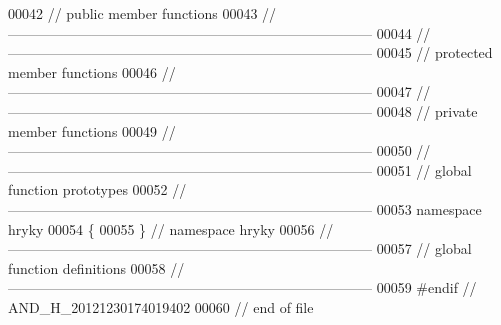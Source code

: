 \begin{DoxyCode}
00042 \textcolor{comment}{// public member functions}
00043 \textcolor{comment}{//
      ------------------------------------------------------------------------------}
00044 \textcolor{comment}{//
      ------------------------------------------------------------------------------}
00045 \textcolor{comment}{// protected member functions}
00046 \textcolor{comment}{//
      ------------------------------------------------------------------------------}
00047 \textcolor{comment}{//
      ------------------------------------------------------------------------------}
00048 \textcolor{comment}{// private member functions}
00049 \textcolor{comment}{//
      ------------------------------------------------------------------------------}
00050 \textcolor{comment}{//
      ------------------------------------------------------------------------------}
00051 \textcolor{comment}{// global function prototypes}
00052 \textcolor{comment}{//
      ------------------------------------------------------------------------------}
00053 \textcolor{keyword}{namespace }hryky
00054 \{
00055 \} \textcolor{comment}{// namespace hryky}
00056 \textcolor{comment}{//
      ------------------------------------------------------------------------------}
00057 \textcolor{comment}{// global function definitions}
00058 \textcolor{comment}{//
      ------------------------------------------------------------------------------}
00059 \textcolor{preprocessor}{#endif // AND\_H\_20121230174019402}
00060 \textcolor{preprocessor}{}\textcolor{comment}{// end of file}
\end{DoxyCode}
